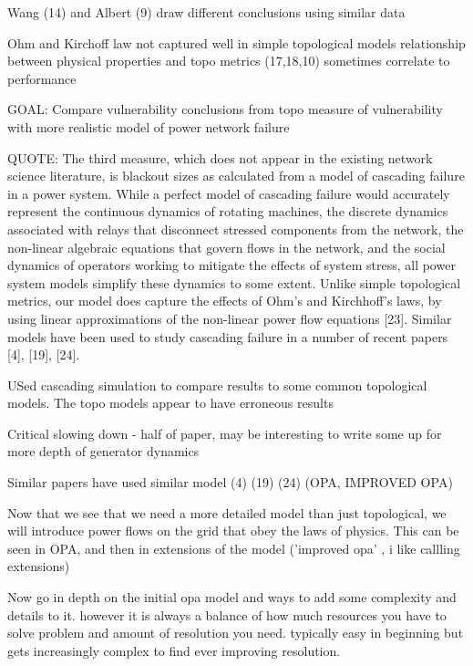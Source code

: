 Wang (14) and Albert (9) draw different conclusions using similar data

Ohm and Kirchoff law not captured well in simple topological models
relationship between physical properties and topo metrics (17,18,10) sometimes correlate to performance

GOAL: Compare vulnerability conclusions from topo measure of vulnerability with more realistic model of power network failure

QUOTE: The third measure, which does not appear in the
existing network science literature, is blackout sizes as
calculated from a model of cascading failure in a power
system. While a perfect model of cascading failure
would accurately represent the continuous dynamics
of rotating machines, the discrete dynamics associated
with relays that disconnect stressed components from
the network, the non-linear algebraic equations that
govern flows in the network, and the social dynamics
of operators working to mitigate the effects of system
stress, all power system models simplify these
dynamics to some extent. Unlike simple topological
metrics, our model does capture the effects of Ohm’s
and Kirchhoff’s laws, by using linear approximations
of the non-linear power flow equations [23]. Similar
models have been used to study cascading failure in a
number of recent papers [4], [19], [24].

USed cascading simulation to compare results to some common topological models.  The topo models appear to have erroneous results


Critical slowing down - half of paper, may be interesting to write some up for more depth of generator dynamics




  Similar papers have used similar model (4) (19) (24)  (OPA, IMPROVED OPA)


Now that we see that we need a more detailed model than just topological, we will introduce power flows on the grid that obey the laws of physics.  This can be seen in OPA, and then in extensions of the model ('improved opa' , i like callling extensions)

Now go in depth on the initial opa model and ways to add some complexity and details to it.  however it is always a balance of how much resources you have to solve problem and amount of resolution you need.  typically easy in beginning but gets increasingly complex to find ever improving resolution.



